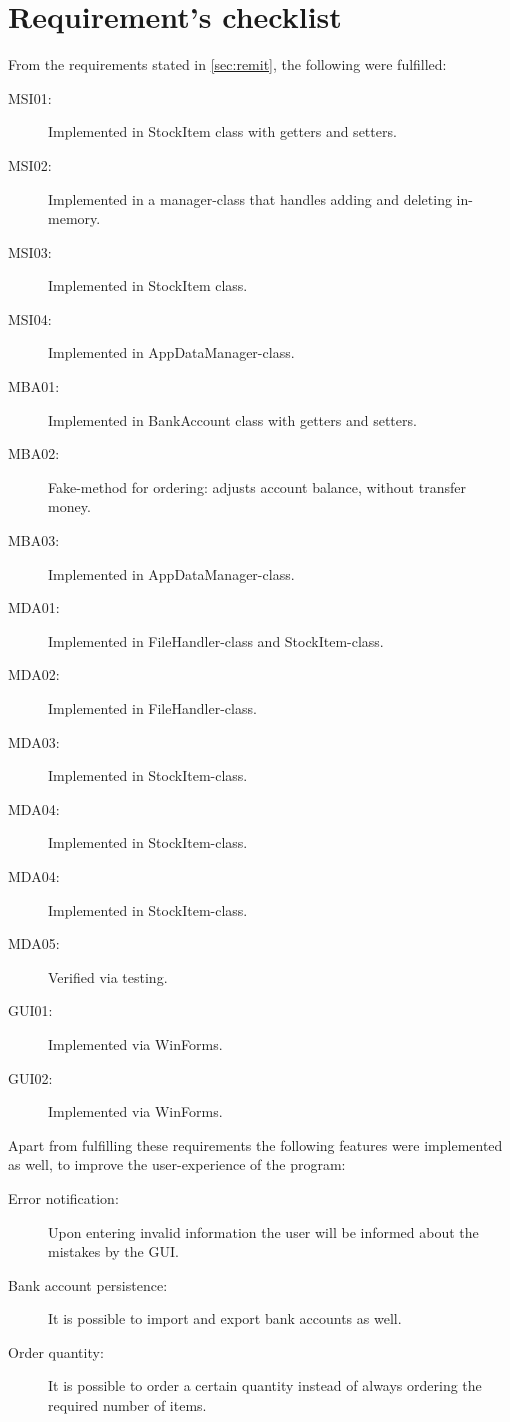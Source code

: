 \chapter{Requirement's checklist}\label{ch:requirements} %

From the requirements stated in \autoref{sec:remit}, the following were fulfilled:

\begin{description}
\item[MSI01:] Implemented in StockItem class with getters and setters.
\item[MSI02:] Implemented in a manager-class that handles adding and deleting in-memory.
\item[MSI03:] Implemented in StockItem class.
\item[MSI04:] Implemented in AppDataManager-class.
\item[MBA01:] Implemented in BankAccount class with getters and setters.
\item[MBA02:] Fake-method for ordering: adjusts account balance, without transfer money.
\item[MBA03:] Implemented in AppDataManager-class.
\item[MDA01:] Implemented in FileHandler-class and StockItem-class.
\item[MDA02:] Implemented in FileHandler-class.
\item[MDA03:] Implemented in StockItem-class.
\item[MDA04:] Implemented in StockItem-class.
\item[MDA04:] Implemented in StockItem-class.
\item[MDA05:] Verified via testing.
\item[GUI01:] Implemented via WinForms.
\item[GUI02:] Implemented via WinForms.
\end{description}

Apart from fulfilling these requirements the following features were implemented as well, to improve the user-experience of the program:

\begin{description}
\item[Error notification:] Upon entering invalid information the user will be informed about the mistakes by the \ac{GUI}.
\item[Bank account persistence:] It is possible to import and export bank accounts as well.
\item[Order quantity:] It is possible to order a certain quantity instead of always ordering the required number of items.
\end{description}